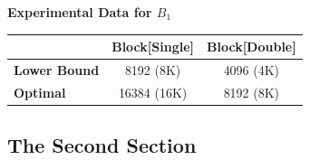 \textbf{Experimental Data for $B_1$}

\begin{figure}[htb]
    \centering
    \label{fig:dot_Stuning_block1}
    \qquad
    \label{fig:dot_Dtuning_block1}
\end{figure}

\begin{table}[ht]
    \centering
    \begin{tabular}{l|c|c|}
        & \textbf{Block[Single]} & \textbf{Block[Double]}\\
        \hline
        \textbf{Lower Bound} & 8192 (8K) & 4096 (4K)\\
        \hline
        \textbf{Optimal} & 16384 (16K) & 8192 (8K)\\
        \hline
    \end{tabular}
\end{table}

\subsection{The Second Section}


